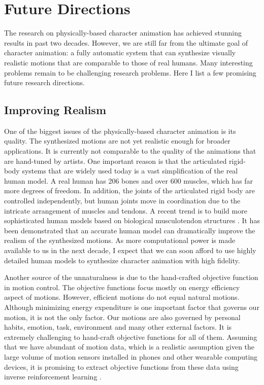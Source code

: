 \section{Future Directions}

The research on physically-based character animation has achieved stunning results in past two decades. However, we are still far from the ultimate goal of character animation: a fully automatic system that can synthesize visually realistic motions that are comparable to those of real humans. Many interesting problems remain to be challenging research problems. Here I list a few promising future research directions.

\subsection{Improving Realism}

One of the biggest issues of the physically-based character animation is its quality. The synthesized motions are not yet realistic enough for broader applications. It is currently not comparable to the quality of the animations that are hand-tuned by artists. One important reason is that the articulated rigid-body systems that are widely used today is a vast simplification of the real human model. A real human has 206 bones and over 600 muscles, which has far more degrees of freedom. In addition, the joints of the articulated rigid body are controlled independently, but human joints move in coordination due to the intricate arrangement of muscles and tendons. A recent trend is to build more sophisticated human models based on biological musculotendon structures \cite{Lee:2006,Lee:2009:CBM,Wang:2012}. It has been demonstrated that an accurate human model can dramatically improve the realism of the synthesized motions. As more computational power is made available to us in the next decade, I expect that we can soon afford to use highly detailed human models to synthesize character animation with high fidelity.

Another source of the unnaturalness is due to the hand-crafted objective function in motion control. The objective functions focus mostly on energy efficiency aspect of motions. However, efficient motions do not equal natural motions. Although minimizing energy expenditure is one important factor that governs our motion, it is not the only factor. Our motions are also governed by personal habits, emotion, task, environment and many other external factors. It is extremely challenging to hand-craft objective functions for all of them. Assuming that we have abundant of motion data, which is a realistic assumption given the large volume of motion sensors installed in phones and other wearable computing devices, it is promising to extract objective functions from these data using inverse reinforcement learning \cite{Ng:2000}.


